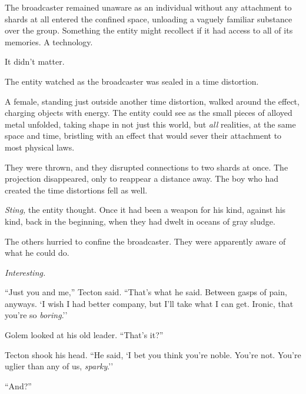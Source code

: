 The broadcaster remained unaware as an individual without any attachment to shards at all entered the confined space, unloading a vaguely familiar substance over the group.  Something the entity might recollect if it had access to all of its memories.  A technology.



It didn't matter.



The entity watched as the broadcaster was sealed in a time distortion.



A female, standing just outside another time distortion, walked around the effect, charging objects with energy.  The entity could see as the small pieces of alloyed metal unfolded, taking shape in not just this world, but \emph{all} realities, at the same space and time, bristling with an effect that would sever their attachment to most physical laws.



They were thrown, and they disrupted connections to two shards at once.  The projection disappeared, only to reappear a distance away.  The boy who had created the time distortions fell as well.



\emph{Sting, }the entity thought.  Once it had been a weapon for his kind, against his kind, back in the beginning, when they had dwelt in oceans of gray sludge.



The others hurried to confine the broadcaster.  They were apparently aware of what he could do.



\emph{Interesting.}



\blacksquare



``Just you and me,'' Tecton said.  ``That's what he said.  Between gasps of pain, anyways.  `I wish I had better company, but I'll take what I can get.  Ironic, that you're so \emph{boring}.''



Golem looked at his old leader.  ``That's it?''



Tecton shook his head.  ``He said, `I bet you think you're noble.  You're not.  You're uglier than any of us, \emph{sparky}.''



``And?''



